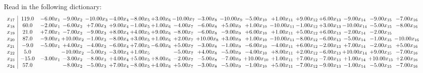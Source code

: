 \documentclass[9pt]{article}
\begin{document}
Read in the following dictionary:
\[\begin{array}{c| c c@{\hskip 2pt} c@{\hskip 2pt} c@{\hskip 2pt} c@{\hskip 2pt} c@{\hskip 2pt} c@{\hskip 2pt} c@{\hskip 2pt} c@{\hskip 2pt} c@{\hskip 2pt} c@{\hskip 2pt} c@{\hskip 2pt} c@{\hskip 2pt} c@{\hskip 2pt} c@{\hskip 2pt} c@{\hskip 2pt} c@{\hskip 2pt} }
 x_{17}   &  119.0 & -6.00 x_{1} & -9.00 x_{2} & -10.00 x_{3} & -4.00 x_{4} & -8.00 x_{5} & +  3.00 x_{6} & -10.00 x_{7} & -3.00 x_{8} & -10.00 x_{9} & -5.00 x_{10} & +  1.00 x_{11} & +  9.00 x_{12} & +  6.00 x_{13} & -9.00 x_{14} & -9.00 x_{15} & -7.00 x_{16}\\
 x_{18}   &  60.0 & -2.00 x_{1} & -6.00 x_{2} & +  7.00 x_{3} & +  9.00 x_{4} & -1.00 x_{5} & +  1.00 x_{6} & -4.00 x_{7} & -6.00 x_{8} & +  5.00 x_{9} & +  1.00 x_{10} & -10.00 x_{11} & -1.00 x_{12} & +  3.00 x_{13} & -10.00 x_{14} & -5.00 x_{15} & -8.00 x_{16}\\
 x_{19}   &  21.0 & +  7.00 x_{1} & -7.00 x_{2} & -9.00 x_{3} & +  8.00 x_{4} & +  4.00 x_{5} & +  9.00 x_{6} & -8.00 x_{7} & -6.00 x_{8} & -9.00 x_{9} & +  6.00 x_{10} & +  1.00 x_{11} & +  5.00 x_{12} & +  6.00 x_{13} & -2.00 x_{14} & -2.00 x_{15} &   \\
 x_{20}   &  87.0 & -9.00 x_{1} & + 10.00 x_{2} & -1.00 x_{3} & -8.00 x_{4} & +  3.00 x_{5} & +  1.00 x_{6} & +  2.00 x_{7} & + 10.00 x_{8} & +  3.00 x_{9} & +  1.00 x_{10} & -10.00 x_{11} & -8.00 x_{12} & -6.00 x_{13} & -5.00 x_{14} & -1.00 x_{15} & -10.00 x_{16}\\
 x_{21}   &  -9.0 & -5.00 x_{1} & +  4.00 x_{2} & -4.00 x_{3} & -6.00 x_{4} & +  7.00 x_{5} & -6.00 x_{6} & +  5.00 x_{7} & -3.00 x_{8} & -1.00 x_{9} & -6.00 x_{10} & -4.00 x_{11} & +  6.00 x_{12} & -2.00 x_{13} & +  7.00 x_{14} & -2.00 x_{15} & +  5.00 x_{16}\\
 x_{22}   &  5.0  &   & -10.00 x_{2} & -5.00 x_{3} & -3.00 x_{4} & +  1.00 x_{5} &   & -5.00 x_{7} & +  4.00 x_{8} & -5.00 x_{9} & -4.00 x_{10} & +  8.00 x_{11} & +  2.00 x_{12} & -6.00 x_{13} & + 10.00 x_{14} & +  9.00 x_{15} & -7.00 x_{16}\\
 x_{23}   &  -15.0 & -3.00 x_{1} & -3.00 x_{2} & -8.00 x_{3} & +  4.00 x_{4} & +  5.00 x_{5} & +  8.00 x_{6} & -2.00 x_{7} & -5.00 x_{8} & -7.00 x_{9} & + 10.00 x_{10} & +  1.00 x_{11} & +  7.00 x_{12} & -7.00 x_{13} & +  1.00 x_{14} & + 10.00 x_{15} & +  2.00 x_{16}\\
 x_{24}   &  57.0  &   & -8.00 x_{2} & -5.00 x_{3} & +  7.00 x_{4} & -8.00 x_{5} & +  4.00 x_{6} & +  5.00 x_{7} & -3.00 x_{8} & -5.00 x_{9} & -1.00 x_{10} & +  5.00 x_{11} & -7.00 x_{12} & -9.00 x_{13} & -1.00 x_{14} & -5.00 x_{15} & -7.00 x_{16}\\

\end{array}\]
\end{document}
